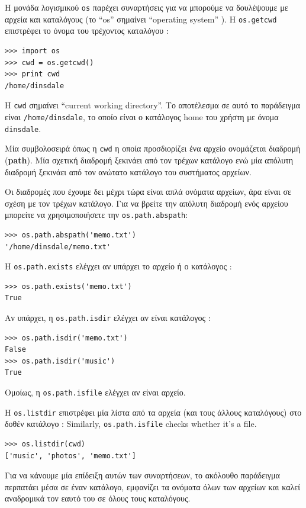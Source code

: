 \documentclass[10pt]{book}
\begin{document}
Η μονάδα λογισμικού  {\tt os}  παρέχει συναρτήσεις για να μπορούμε να δουλέψουμε με αρχεία και καταλόγους (το  ``os''  σημαίνει  ``operating system'' ). Η  {\tt os.getcwd}  επιστρέφει το όνομα του τρέχοντος καταλόγου :

\begin{verbatim}
>>> import os
>>> cwd = os.getcwd()
>>> print cwd
/home/dinsdale
\end{verbatim}
%
 Η  {\tt cwd}  σημαίνει  ``current working directory''.  Το αποτέλεσμα σε αυτό το παράδειγμα είναι  {\tt /home/dinsdale},  το οποίο είναι ο κατάλογος  home  του χρήστη με όνομα  {\tt dinsdale}.

 Μία συμβολοσειρά όπως η  {\tt cwd}  η οποία προσδιορίζει ένα αρχείο ονομάζεται διαδρομή  ({\bf path}).  
Μία σχετική διαδρομή ξεκινάει από τον τρέχων κατάλογο ενώ μία απόλυτη διαδρομή ξεκινάει από τον ανώτατο κατάλογο του συστήματος αρχείων.

Οι διαδρομές που έχουμε δει μέχρι τώρα είναι απλά ονόματα αρχείων, άρα είναι σε σχέση με τον τρέχων κατάλογο. Για να βρείτε την 
απόλυτη διαδρομή ενός αρχείου μπορείτε να χρησιμοποιήσετε την  {\tt os.path.abspath}:

\begin{verbatim}
>>> os.path.abspath('memo.txt')
'/home/dinsdale/memo.txt'
\end{verbatim}
%
 Η  {\tt os.path.exists}  ελέγχει αν υπάρχει το αρχείο ή ο κατάλογος :

\begin{verbatim}
>>> os.path.exists('memo.txt')
True
\end{verbatim}
%
 Αν υπάρχει, η  {\tt os.path.isdir}  ελέγχει αν είναι κατάλογος :

\begin{verbatim}
>>> os.path.isdir('memo.txt')
False
>>> os.path.isdir('music')
True
\end{verbatim}
%
 Ομοίως, η  {\tt os.path.isfile}  ελέγχει αν είναι αρχείο. 

Η  {\tt os.listdir}  επιστρέφει μία λίστα από τα αρχεία (και τους άλλους καταλόγους) στο δοθέν κατάλογο :
Similarly, {\tt os.path.isfile} checks whether it's a file.

\begin{verbatim}
>>> os.listdir(cwd)
['music', 'photos', 'memo.txt']
\end{verbatim}
%
 Για να κάνουμε μία επίδειξη αυτών των συναρτήσεων, το ακόλουθο παράδειγμα περπατάει μέσα σε έναν κατάλογο, εμφανίζει τα ονόματα 
όλων των αρχείων και καλεί αναδρομικά τον εαυτό του σε όλους τους καταλόγους. 
\end{document}
